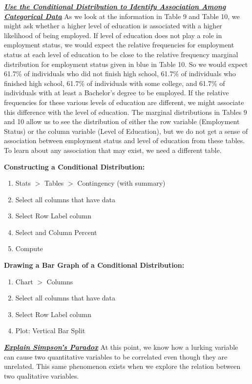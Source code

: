 \documentclass{report}
\begin{document}
    \pagebreak \bigbreak \noindent
    \textbf{\textit{\underline{Use the Conditional Distribution to Identify Association Among Categorical Data}}}
    \bigbreak \noindent 
    As we look at the information in Table 9 and Table 10, we might ask whether a higher level of education is associated with a higher likelihood of being employed.
    \bigbreak \noindent 
    If level of education does not play a role in employment status, we would expect the relative frequencies for employment status at each level of education to be close to the relative frequency marginal distribution for employment status given in blue in Table 10. So we would expect 61.7\% of individuals who did not finish high school, 61.7\% of individuals who finished high school, 61.7\% of individuals with some college, and 61.7\% of individuals with at least a Bachelor's degree to be employed. If the relative frequencies for these various levels of education are different, we might associate this difference with the level of education.
    \bigbreak \noindent 
    The marginal distributions in Tables 9 and 10 allow us to see the distribution of either the row variable (Employment Status) or the column variable (Level of Education), but we do not get a sense of association between employment status and level of education from these tables.
    \bigbreak \noindent 
    To learn about any association that may exist, we need a different table.

    \bigbreak \noindent \bigbreak \noindent 
    \textbf{Constructing a Conditional Distribution:}
    \bigbreak \noindent 
    \begin{enumerate}
        \item Stats $> $ Tables $>  $ Contingency (with summary)
        \item Select all columns that have data
        \item Select Row Label column
        \item Select and Column Percent
        \item Compute
    \end{enumerate}

    \bigbreak \noindent \bigbreak \noindent 
    \textbf{Drawing a Bar Graph of a Conditional Distribution:}
    \bigbreak \noindent 
    \begin{enumerate}
        \item Chart $> $ Columns 
        \item Select all columns that have data
        \item Select Row Label column
        \item Plot: Vertical Bar Split
    \end{enumerate}

    \bigbreak \noindent \bigbreak \noindent 
    \textbf{\textit{\underline{Explain Simpson's Paradox}}}
    \bigbreak \noindent 
    At this point, we know how a lurking variable can cause two quantitative variables to be correlated even though they are unrelated. This same phenomenon exists when we explore the relation between two qualitative variables.
\end{document}
